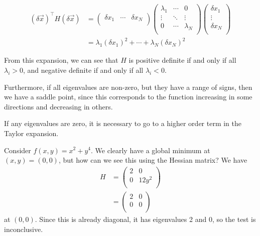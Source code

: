\documentclass{../template/note}
\begin{document}
    \begin{align*}
        (\delta \vec x)^\intercal H (\delta \vec x) &= \begin{pmatrix}
         \delta x_1 & \cdots & \delta x_N \\
        \end{pmatrix} \begin{pmatrix}
         \lambda_1 & \cdots & 0 \\
         \vdots & \ddots & \vdots \\
         0 & \cdots & \lambda_N \\
        \end{pmatrix} \begin{pmatrix}
         \delta x_1 \\
         \vdots \\
         \delta x_N \\
        \end{pmatrix} \\
        &= \lambda_1 (\delta x_1)^2 + \cdots + \lambda_N (\delta x_N)^2
    \end{align*}
    
    From this expansion, we can see that \(H\) is positive definite if and only if all \(\lambda_i > 0\), and negative definite if and only if all \(\lambda_i < 0\).

    Furthermore, if all eigenvalues are non-zero, but they have a range of signs, then we have a saddle point, since this corresponds to the function increasing in some directions and decreasing in others.

    If any eigenvalues are zero, it is necessary to go to a higher order term in the Taylor expansion.

    \begin{example}
        Consider \(f(x, y) = x^2 + y^4\). We clearly have a global minimum at \((x, y) = (0, 0)\), but how can we see this using the Hessian matrix? We have
        \begin{align*}
            H &= \begin{pmatrix}
             2 & 0 \\
             0 & 12y^2 \\
            \end{pmatrix} \\
            &= \begin{pmatrix}
             2 & 0 \\
             0 & 0 \\
            \end{pmatrix}
        \end{align*}
        at \((0, 0)\). Since this is already diagonal, it has eigenvalues 2 and 0, so the test is inconclusive.        
    \end{example}
    
\end{document}
